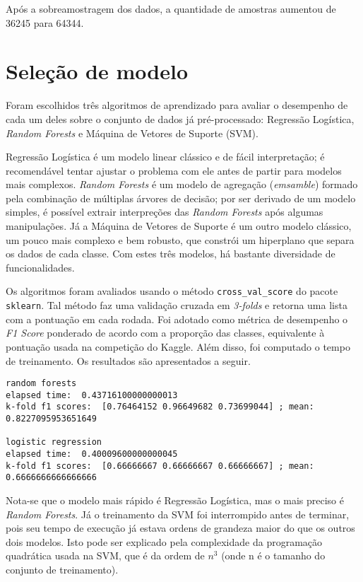 \documentclass[12pt]{article}
\begin{document}
Após a sobreamostragem dos dados, a quantidade de amostras aumentou de 36245 para 64344.

\section{Seleção de modelo}

Foram escolhidos três algoritmos de aprendizado para avaliar o desempenho de cada um deles sobre o conjunto de dados já pré-processado: Regressão Logística, \emph{Random Forests} e Máquina de Vetores de Suporte (SVM).

Regressão Logística é um modelo linear clássico e de fácil interpretação; é recomendável tentar ajustar o problema com ele antes de partir para modelos mais complexos. \emph{Random Forests} é um modelo de agregação (\emph{emsamble}) formado pela combinação de múltiplas árvores de decisão; por ser derivado de um modelo simples, é possível extrair interpreções das \emph{Random Forests} após algumas manipulações. Já a Máquina de Vetores de Suporte é um outro modelo clássico, um pouco mais complexo e bem robusto, que constrói um hiperplano que separa os dados de cada classe. Com estes três modelos, há bastante diversidade de funcionalidades.

Os algoritmos foram avaliados usando o método \texttt{cross\_val\_score} do pacote \texttt{sklearn}. Tal método faz uma validação cruzada em \emph{3-folds} e retorna uma lista com a pontuação em cada rodada. Foi adotado como métrica de desempenho o \emph{F1 Score} ponderado de acordo com a proporção das classes, equivalente à pontuação usada na competição do Kaggle. Além disso, foi computado o tempo de treinamento. Os resultados são apresentados a seguir.

\begin{lstlisting}
random forests
elapsed time:  0.43716100000000013
k-fold f1 scores:  [0.76464152 0.96649682 0.73699044] ; mean:  0.8227095953651649

logistic regression
elapsed time:  0.40009600000000045
k-fold f1 scores:  [0.66666667 0.66666667 0.66666667] ; mean:  0.6666666666666666
\end{lstlisting}

Nota-se que o modelo mais rápido é Regressão Logística, mas o mais preciso é \emph{Random Forests}. Já o treinamento da SVM foi interrompido antes de terminar, pois seu tempo de execução já estava ordens de grandeza maior do que os outros dois modelos. Isto pode ser explicado pela complexidade da programação quadrática usada na SVM, que é da ordem de $n^{3}$ (onde n é o tamanho do conjunto de treinamento).
\end{document}
